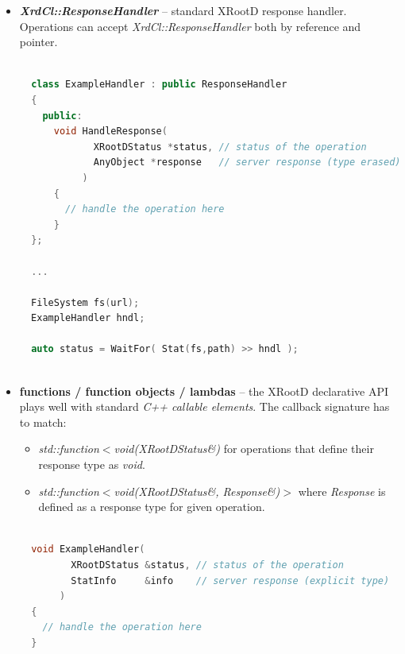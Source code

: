 \documentclass{article}
\begin{document}
        \begin{itemize}

            \item \begin{samepage} \textbf{\textit{XrdCl::ResponseHandler}} -- standard XRootD response handler. Operations can accept \textit{XrdCl::ResponseHandler}
                both by reference and pointer.
                
\begin{lstlisting}[language=C++, xleftmargin=\dimexpr-\leftmargini]

  class ExampleHandler : public ResponseHandler
  {
    public:
      void HandleResponse(
             XRootDStatus *status, // status of the operation
             AnyObject *response   // server response (type erased)
           )
      {
        // handle the operation here
      }
  };	
  
  ...
  
  FileSystem fs(url);
  ExampleHandler hndl;
  
  auto status = WaitFor( Stat(fs,path) >> hndl ); 	
  
\end{lstlisting}
                
            \end{samepage}

            \item \begin{samepage} \textbf{functions / function objects / lambdas} -- the XRootD declarative API plays well with standard \textit{C++ callable
            elements}. The callback signature has to match:
            \begin{itemize}
              \item \textit{std::function$<$void(XRootDStatus\&)} for operations that define their response type as \textit{void}.
              \item \textit{std::function$<$void(XRootDStatus\&, Response\&)$>$} where \textit{Response} is defined as a response type for given operation. 
            \end{itemize}
            
\begin{lstlisting}[language=C++, xleftmargin=\dimexpr-\leftmargini]
  
  void ExampleHandler(         
         XRootDStatus &status, // status of the operation 
         StatInfo     &info    // server response (explicit type)
       )
  {
    // handle the operation here
  }
  

\end{lstlisting}
\end{samepage}
\end{itemize}
\end{document}
